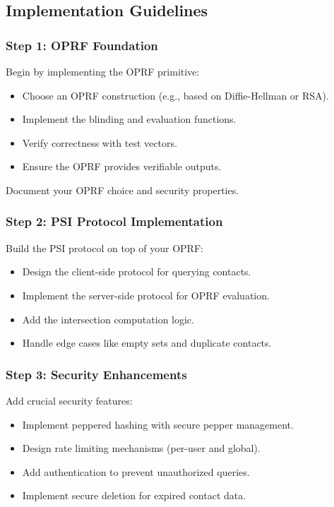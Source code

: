 \documentclass[10pt,a4paper,american]{exam}
\begin{document}
\subsection*{Implementation Guidelines}

\subsubsection*{Step 1: OPRF Foundation}
Begin by implementing the OPRF primitive:
\begin{itemize}
	\item Choose an OPRF construction (e.g., based on Diffie-Hellman or RSA).
	\item Implement the blinding and evaluation functions.
	\item Verify correctness with test vectors.
	\item Ensure the OPRF provides verifiable outputs.
\end{itemize}

Document your OPRF choice and security properties.

\subsubsection*{Step 2: PSI Protocol Implementation}
Build the PSI protocol on top of your OPRF:
\begin{itemize}
	\item Design the client-side protocol for querying contacts.
	\item Implement the server-side protocol for OPRF evaluation.
	\item Add the intersection computation logic.
	\item Handle edge cases like empty sets and duplicate contacts.
\end{itemize}

\subsubsection*{Step 3: Security Enhancements}
Add crucial security features:
\begin{itemize}
	\item Implement peppered hashing with secure pepper management.
	\item Design rate limiting mechanisms (per-user and global).
	\item Add authentication to prevent unauthorized queries.
	\item Implement secure deletion for expired contact data.
\end{itemize}
\end{document}
